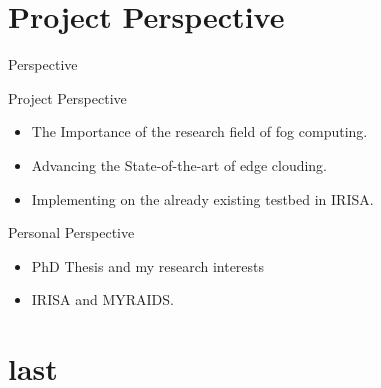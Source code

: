 \documentclass{beamer}
\begin{document}
  
    

 

\section{Project Perspective}
\begin{frame}{Perspective}

\begin{block}{Project Perspective}
    \begin{itemize}
    
    \item The Importance of the research field of fog computing. 
    \item<2-> Advancing the State-of-the-art of edge clouding.
    \item<3-> Implementing on the already existing testbed in IRISA.    
      
    \end{itemize}
    
    \end{block}

\begin{block}{Personal Perspective}
    \begin{itemize}
    
    \item PhD Thesis and my research interests 
    \item<2-> IRISA and MYRAIDS.
   
   
    
    \end{itemize}
    
    \end{block}
   
    


\end{frame}


\section*{last}
\end{document}
